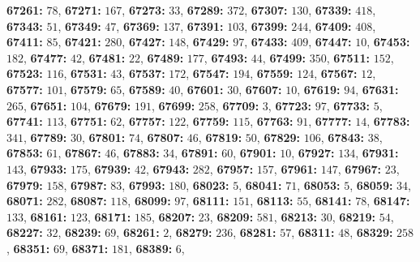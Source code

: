 \textsf{\bfseries 67261:} $78$, \textsf{\bfseries 67271:} $167$, \textsf{\bfseries 67273:} $33$, \textsf{\bfseries 67289:} $372$, \textsf{\bfseries 67307:} $130$, \textsf{\bfseries 67339:} $418$, \textsf{\bfseries 67343:} $51$, \textsf{\bfseries 67349:} $47$, \textsf{\bfseries 67369:} $137$, \textsf{\bfseries 67391:} $103$, \textsf{\bfseries 67399:} $244$, \textsf{\bfseries 67409:} $408$, \textsf{\bfseries 67411:} $85$, \textsf{\bfseries 67421:} $280$, \textsf{\bfseries 67427:} $148$, \textsf{\bfseries 67429:} $97$, \textsf{\bfseries 67433:} $409$, \textsf{\bfseries 67447:} $10$, \textsf{\bfseries 67453:} $182$, \textsf{\bfseries 67477:} $42$, \textsf{\bfseries 67481:} $22$, \textsf{\bfseries 67489:} $177$, \textsf{\bfseries 67493:} $44$, \textsf{\bfseries 67499:} $350$, \textsf{\bfseries 67511:} $152$, \textsf{\bfseries 67523:} $116$, \textsf{\bfseries 67531:} $43$, \textsf{\bfseries 67537:} $172$, \textsf{\bfseries 67547:} $194$, \textsf{\bfseries 67559:} $124$, \textsf{\bfseries 67567:} $12$, \textsf{\bfseries 67577:} $101$, \textsf{\bfseries 67579:} $65$, \textsf{\bfseries 67589:} $40$, \textsf{\bfseries 67601:} $30$, \textsf{\bfseries 67607:} $10$, \textsf{\bfseries 67619:} $94$, \textsf{\bfseries 67631:} $265$, \textsf{\bfseries 67651:} $104$, \textsf{\bfseries 67679:} $191$, \textsf{\bfseries 67699:} $258$, \textsf{\bfseries 67709:} $3$, \textsf{\bfseries 67723:} $97$, \textsf{\bfseries 67733:} $5$, \textsf{\bfseries 67741:} $113$, \textsf{\bfseries 67751:} $62$, \textsf{\bfseries 67757:} $122$, \textsf{\bfseries 67759:} $115$, \textsf{\bfseries 67763:} $91$, \textsf{\bfseries 67777:} $14$, \textsf{\bfseries 67783:} $341$, \textsf{\bfseries 67789:} $30$, \textsf{\bfseries 67801:} $74$, \textsf{\bfseries 67807:} $46$, \textsf{\bfseries 67819:} $50$, \textsf{\bfseries 67829:} $106$, \textsf{\bfseries 67843:} $38$, \textsf{\bfseries 67853:} $61$, \textsf{\bfseries 67867:} $46$, \textsf{\bfseries 67883:} $34$, \textsf{\bfseries 67891:} $60$, \textsf{\bfseries 67901:} $10$, \textsf{\bfseries 67927:} $134$, \textsf{\bfseries 67931:} $143$, \textsf{\bfseries 67933:} $175$, \textsf{\bfseries 67939:} $42$, \textsf{\bfseries 67943:} $282$, \textsf{\bfseries 67957:} $157$, \textsf{\bfseries 67961:} $147$, \textsf{\bfseries 67967:} $23$, \textsf{\bfseries 67979:} $158$, \textsf{\bfseries 67987:} $83$, \textsf{\bfseries 67993:} $180$, \textsf{\bfseries 68023:} $5$, \textsf{\bfseries 68041:} $71$, \textsf{\bfseries 68053:} $5$, \textsf{\bfseries 68059:} $34$, \textsf{\bfseries 68071:} $282$, \textsf{\bfseries 68087:} $118$, \textsf{\bfseries 68099:} $97$, \textsf{\bfseries 68111:} $151$, \textsf{\bfseries 68113:} $55$, \textsf{\bfseries 68141:} $78$, \textsf{\bfseries 68147:} $133$, \textsf{\bfseries 68161:} $123$, \textsf{\bfseries 68171:} $185$, \textsf{\bfseries 68207:} $23$, \textsf{\bfseries 68209:} $581$, \textsf{\bfseries 68213:} $30$, \textsf{\bfseries 68219:} $54$, \textsf{\bfseries 68227:} $32$, \textsf{\bfseries 68239:} $69$, \textsf{\bfseries 68261:} $2$, \textsf{\bfseries 68279:} $236$, \textsf{\bfseries 68281:} $57$, \textsf{\bfseries 68311:} $48$, \textsf{\bfseries 68329:} $258$, \textsf{\bfseries 68351:} $69$, \textsf{\bfseries 68371:} $181$, \textsf{\bfseries 68389:} $6$, 
